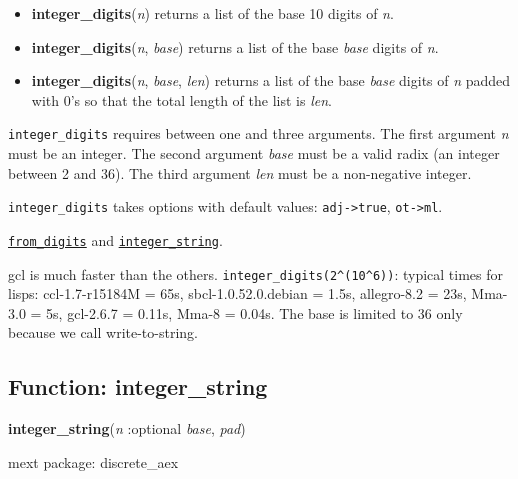 \documentclass[]{article}
\begin{document}
\vspace{5 pt}
\begin{itemize}
\item[] {\bf integer\_digits}({\it n})
  returns a list of the base 10 digits of {\it n}. 

\item[] {\bf integer\_digits}({\it n}, {\it base})
  returns a list of the base {\it base} digits of {\it n}. 

\item[] {\bf integer\_digits}({\it n}, {\it base}, {\it len})
  returns a list of the base {\it base} digits of {\it n} padded with 0's so that the total length of the list is {\it len}. 

\end{itemize}
   {\tt integer\_digits} requires between one and three arguments.
    The first argument {\it n} must be an integer.
    The second argument {\it base} must be a valid radix (an integer between 2 and 36).
    The third argument {\it len} must be a non-negative integer.


\vspace{5 pt}

{\tt integer\_digits} takes options with default values: {\tt adj->true}, {\tt ot->ml}.
\vspace{5 pt}


 \hyperlink{from_digits}{{\tt from\_digits}} and \hyperlink{integer_string}{{\tt integer\_string}}.

\vspace{5 pt}


gcl is much faster than the others. \verb#integer_digits(2^(10^6))#: typical times for lisps: ccl-1.7-r15184M = 65s, sbcl-1.0.52.0.debian = 1.5s, allegro-8.2 = 23s, Mma-3.0 = 5s, gcl-2.6.7 = 0.11s, Mma-8 = 0.04s. The base is limited to 36 only because we call write-to-string. 

\vspace{5 pt}


\subsection{Function: integer\_string\label{sec:integer_string}}
\hypertarget{integer_string}{}
{\bf integer\_string}({\it n} :optional {\it base}, {\it pad})


\noindent mext package: discrete\_aex
\end{document}
